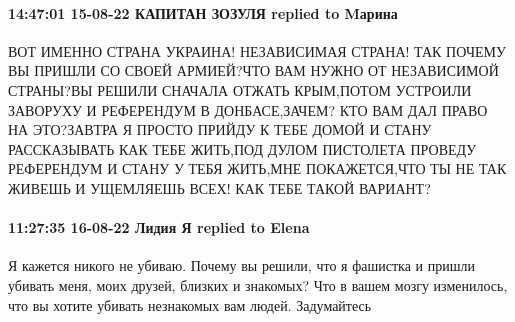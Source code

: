  
 
 
 
 

\paragraph{14:47:01 15-08-22 КАПИТАН ЗОЗУЛЯ replied to Mарина}

ВОТ ИМЕННО СТРАНА УКРАИНА! НЕЗАВИСИМАЯ СТРАНА! ТАК ПОЧЕМУ ВЫ ПРИШЛИ СО СВОЕЙ
АРМИЕЙ?ЧТО ВАМ НУЖНО ОТ НЕЗАВИСИМОЙ СТРАНЫ?ВЫ РЕШИЛИ СНАЧАЛА ОТЖАТЬ КРЫМ,ПОТОМ
УСТРОИЛИ ЗАВОРУХУ И РЕФЕРЕНДУМ В ДОНБАСЕ,ЗАЧЕМ? КТО ВАМ ДАЛ ПРАВО НА ЭТО?ЗАВТРА
Я ПРОСТО ПРИЙДУ К ТЕБЕ ДОМОЙ И СТАНУ РАССКАЗЫВАТЬ КАК ТЕБЕ ЖИТЬ,ПОД ДУЛОМ
ПИСТОЛЕТА ПРОВЕДУ РЕФЕРЕНДУМ И СТАНУ У ТЕБЯ ЖИТЬ,МНЕ ПОКАЖЕТСЯ,ЧТО ТЫ НЕ ТАК
ЖИВЕШЬ И УЩЕМЛЯЕШЬ ВСЕХ! КАК ТЕБЕ ТАКОЙ ВАРИАНТ?

\paragraph{11:27:35 16-08-22 Лидия Я replied to Elena}

Я кажется никого не убиваю. Почему вы решили, что я фашистка и пришли убивать
меня, моих друзей, близких и знакомых? Что в вашем мозгу изменилось, что вы
хотите убивать незнакомых вам людей. Задумайтесь
